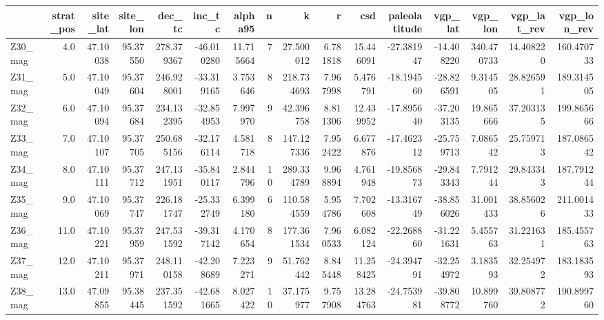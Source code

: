 \documentclass[11pt]{article}
\begin{document}
    \begin{sidewaystable}
    {\tiny\begin{tabular}{lrrrrrrrrrrrrrrr}
\toprule
{} &  strat\_pos &  site\_lat &  site\_lon &      dec\_tc &     inc\_tc &    alpha95 &   n &           k &         r &        csd &  paleolatitude &    vgp\_lat &     vgp\_lon &  vgp\_lat\_rev &  vgp\_lon\_rev \\
\midrule
Z30\_mag &        4.0 &  47.10038 &  95.37550 &  278.379367 & -46.010280 &  11.715664 &   7 &   27.500012 &  6.781818 &  15.446091 &     -27.381947 & -14.408220 &  340.470733 &    14.408220 &   160.470733 \\
Z31\_mag &        5.0 &  47.10049 &  95.37604 &  246.928001 & -33.319165 &   3.753646 &   8 &  218.734693 &  7.967998 &   5.476791 &     -18.194560 & -28.826591 &    9.314505 &    28.826591 &   189.314505 \\
Z32\_mag &        6.0 &  47.10094 &  95.37684 &  234.132395 & -32.854953 &   7.997970 &   9 &   42.396758 &  8.811306 &  12.439952 &     -17.895640 & -37.203135 &   19.865666 &    37.203135 &   199.865666 \\
Z33\_mag &        7.0 &  47.10107 &  95.37705 &  250.685156 & -32.176114 &   4.581718 &   8 &  147.127336 &  7.952422 &   6.677876 &     -17.462312 & -25.759713 &    7.086542 &    25.759713 &   187.086542 \\
Z34\_mag &        8.0 &  47.10111 &  95.37712 &  247.131951 & -35.840117 &   2.844796 &  10 &  289.334789 &  9.968894 &   4.761948 &     -19.856873 & -29.843343 &    7.791244 &    29.843343 &   187.791244 \\
Z35\_mag &        9.0 &  47.10069 &  95.37747 &  226.181747 & -25.332749 &   6.399180 &   6 &  110.584559 &  5.954786 &   7.702608 &     -13.316749 & -38.856026 &   31.001433 &    38.856026 &   211.001433 \\
Z36\_mag &       11.0 &  47.10221 &  95.37959 &  247.531592 & -39.317142 &   4.170654 &   8 &  177.361534 &  7.960533 &   6.082124 &     -22.268860 & -31.221631 &    5.455763 &    31.221631 &   185.455763 \\
Z37\_mag &       12.0 &  47.10211 &  95.37971 &  248.110158 & -42.208689 &   7.223271 &   9 &   51.762442 &  8.845448 &  11.258425 &     -24.394791 & -32.254972 &    3.183593 &    32.254972 &   183.183593 \\
Z38\_mag &       13.0 &  47.09855 &  95.38445 &  237.351592 & -42.681665 &   8.027422 &  10 &   37.175977 &  9.757908 &  13.284763 &     -24.753981 & -39.808772 &   10.899760 &    39.808772 &   190.899760 \\

\end{tabular}}
\end{sidewaystable}
\end{document}
